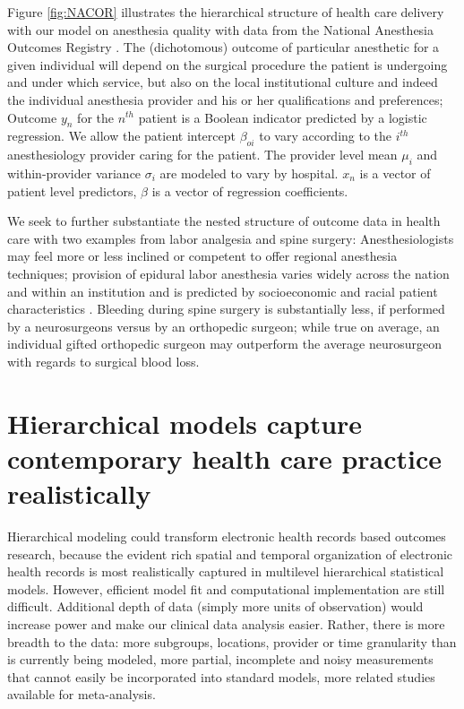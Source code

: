 \documentclass[11pt,notitlepage]{article}
\begin{document}
Figure \ref{fig:NACOR} illustrates the hierarchical structure of health care delivery with our model on anesthesia quality with data from the National Anesthesia Outcomes Registry . The (dichotomous) outcome of particular anesthetic for a given individual will depend on the surgical procedure the patient is undergoing and under which service, but also on the local institutional culture and indeed the individual anesthesia provider and his or her qualifications and preferences\cite{AndreaeWhite2015}; Outcome $y_n$ for the $n^{th}$ patient is a Boolean indicator predicted by a logistic regression. We allow the patient intercept $\beta_{oi}$ to vary according to the $i^{th}$ anesthesiology provider caring for the patient. The provider level mean $\mu_i$ and within-provider variance $\sigma_i$ are modeled to vary by hospital. $x_n$ is a vector of patient level predictors, $\beta$ is a vector of regression coefficients.  

We seek to further substantiate the nested structure of outcome data in health care with two examples from labor analgesia and spine surgery: Anesthesiologists may feel more or less inclined or competent to offer regional anesthesia techniques; provision of epidural labor anesthesia varies widely across the nation and within an institution and is predicted by socioeconomic and racial patient characteristics \cite{Rust2004,Glance2007}. Bleeding during spine surgery is substantially less, if performed by a neurosurgeons versus by an orthopedic surgeon; while true on average, an individual gifted orthopedic surgeon may outperform the average neurosurgeon with regards to surgical blood loss.

\section*{Hierarchical models capture contemporary health care practice realistically}
Hierarchical modeling could transform electronic health records based outcomes research, because the evident rich spatial and temporal organization of electronic health records is most realistically captured in multilevel hierarchical statistical models. However, efficient model fit and computational implementation are still difficult.  Additional depth of data (simply more units of observation) would increase power and make our clinical data analysis easier. Rather, there is more breadth to the data: more subgroups, locations, provider or time granularity than is currently being modeled, more partial, incomplete and noisy measurements that cannot easily be incorporated into standard models, more related studies available for meta-analysis\cite{Andreae2015,Andreae2012}.
\end{document}
